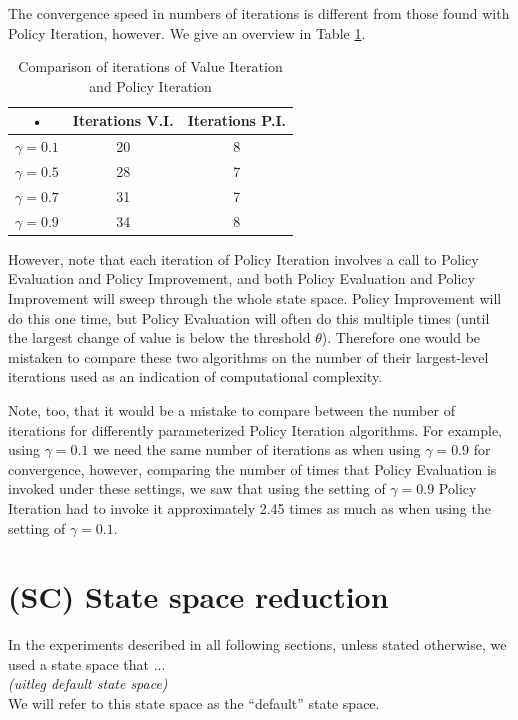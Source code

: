 \documentclass{article}
\begin{document}
The convergence speed in numbers of iterations is different from those found with Policy Iteration, however. We give an overview in Table \ref{tab:policyEvaluationValues}.

\begin{table}[htb]
\centering
\begin{tabular}{|c|c|c|}
\hline 
• & Iterations V.I. & Iterations P.I. \\ 
\hline 
$\gamma = 0.1 $ & 20 & 8 \\ 
\hline 
$\gamma = 0.5 $ & 28 & 7 \\ 
\hline 
$\gamma = 0.7 $  & 31 & 7 \\ 
\hline 
$\gamma = 0.9 $ & 34 & 8 \\ 
\hline 
\end{tabular}
\caption{Comparison of iterations of Value Iteration and Policy Iteration}
\label{tab:policyEvaluationValues} 
\end{table}

However, note that each iteration of Policy Iteration involves a call to Policy Evaluation and Policy Improvement, and both Policy Evaluation and Policy Improvement will sweep through the whole state space. Policy Improvement will do this one time, but Policy Evaluation will often do this multiple times (until the largest change of value is below the threshold $\theta$). Therefore one would be mistaken to compare these two algorithms on the number of their largest-level iterations used as an indication of computational complexity. 

Note, too, that it would be a mistake to compare between the number of iterations for differently parameterized Policy Iteration algorithms. For example, using  $\gamma = 0.1 $ we need the same number of iterations as when using $\gamma = 0.9 $  for convergence, however, comparing the number of times that Policy Evaluation is invoked under these settings, we saw that using the setting of $\gamma = 0.9 $ Policy Iteration had to invoke it approximately 2.45 times as much as when using the setting of $\gamma = 0.1 $. 





\section{(SC) State space reduction}
In the experiments described in all following sections, unless stated otherwise, we used a state space that ...\\
\emph{ (uitleg default state space)}\\
We will refer to this state space as the ``default'' state space.\\
\end{document}
